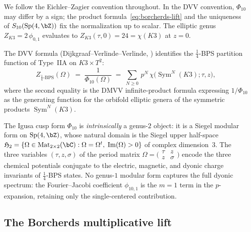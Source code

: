 \begin{remark}[Conventions]\label{rem:bkm-conventions}
We follow the Eichler--Zagier convention throughout.
In the DVV convention, $\Phi_{10}$ may differ
by a sign; the product formula~\eqref{eq:borcherds-lift}
and the uniqueness of $S_{10}(\operatorname{Sp}(4,\bZ))$
fix the normalization up to scalar. The elliptic genus
$Z_{K3} = 2\,\phi_{0,1}$ evaluates to
$Z_{K3}(\tau,0) = 24 = \chi(K3)$ at $z = 0$.
\end{remark}

The DVV formula (Dijkgraaf--Verlinde--Verlinde,
\cite{DMVV}) identifies the $\frac{1}{4}$-BPS
partition function of Type~IIA on $K3 \times T^2$:
\begin{equation}\label{eq:dvv}
Z_{\frac{1}{4}\text{-BPS}}(\Omega) \;=\; \frac{1}{\Phi_{10}(\Omega)}
\;=\; \sum_{N \geq 0}\,p^N\,\chi\bigl(\operatorname{Sym}^N(K3);
\tau,z\bigr),
\end{equation}
where the second equality is the DMVV infinite-product formula
expressing $1/\Phi_{10}$ as the generating function for the
orbifold elliptic genera of the symmetric products
$\operatorname{Sym}^N(K3)$.

\begin{proposition}
\label{prop:phi10-genus2}
The Igusa cusp form $\Phi_{10}$ is \emph{intrinsically}
a genus-$2$ object: it is a Siegel modular form on
$\operatorname{Sp}(4,\bZ)$, whose natural domain is the
Siegel upper half-space
$\mathfrak{H}_2 = \{\Omega \in \mathrm{Mat}_{2 \times 2}(\bC)
: \Omega = \Omega^t,\; \operatorname{Im}(\Omega) > 0\}$
of complex dimension~$3$. The three
variables $(\tau,z,\sigma)$ of the period matrix
$\Omega = \bigl(\begin{smallmatrix} \tau & z \\
z & \sigma\end{smallmatrix}\bigr)$ encode the three
chemical potentials conjugate to the electric, magnetic,
and dyonic charge invariants of $\frac{1}{4}$-BPS states.
No genus-$1$ modular form captures the full dyonic
spectrum: the Fourier--Jacobi coefficient $\phi_{10,1}$
is the $m = 1$ term in the $p$-expansion, retaining only
the single-centered contribution.
\end{proposition}

\subsection{The Borcherds multiplicative lift}
\label{subsec:borcherds-lift}

